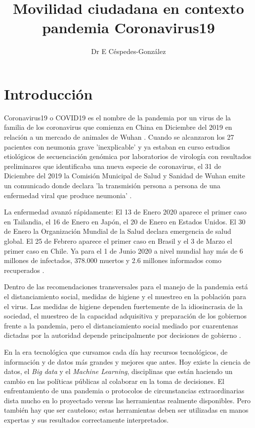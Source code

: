 \documentclass{article}
\title{Movilidad ciudadana en contexto pandemia Coronavirus19}
\author{Dr E Céspedes-González}
\date{\fechafinal}
\begin{document}
\maketitle
\tableofcontents

\newpage

\section{Introducción}

Coronavirus19 o COVID19 es el nombre de la pandemia por un virus de la familia de los coronavirus que comienza en China en Diciembre del 2019 en relación a un mercado de animales de Wuhan \cite{wang_novel_2020}. Cuando se alcanzaron los 27 pacientes con neumonia grave 'inexplicable' y ya estaban en curso estudios etiológicos de secuenciación genómica por laboratorios de virología con resultados preliminares que identificaba una nueva especie de coronavirus, el 31 de Diciembre del 2019 la Comisión Municipal de Salud y Sanidad de Wuhan emite un comunicado donde declara 'la transmisión persona a persona de una enfermedad viral que produce neumonia' \cite{oms_oms_2020}.

La enfermedad avanzó rápidamente:  El 13 de Enero 2020 aparece el primer caso en Tailandia, el 16 de Enero en Japón, el 20 de Enero en Estados Unidos. El 30 de Enero la Organización Mundial de la Salud declara emergencia de salud global. El 25 de Febrero aparece el primer caso en Brasil y el 3 de Marzo el primer caso en Chile. Ya para el 1 de Junio 2020 a nivel mundial hay más de 6 millones de infectados, 378.000 muertos y 2.6 millones informados como recuperados \cite{oms_covid-19_2020}.

Dentro de las recomendaciones transversales para el manejo de la pandemia está el distanciamiento social, medidas de higiene y el muestreo en la población para el virus. Las medidas de higiene dependen fuertemente de la idiosincrasia de la sociedad, el muestreo de la capacidad adquisitiva y preparación de los gobiernos frente a la pandemia, pero el distanciamiento social mediado por cuarentenas dictadas por la autoridad depende principalmente por decisiones de gobierno \cite{painter_political_2020, organization_critical_2020}.

En la era tecnológica que cursamos cada día hay recursos tecnológicos, de información y de datos más grandes y mejores que antes. Hoy existe la ciencia de datos, el \textit{Big data} y el \textit{Machine Learning}, disciplinas que están haciendo un cambio en las políticas públicas al colaborar en la toma de decisiones. El enfrentamiento de una pandemia o protocolos de circunstancias extraordinarias dista mucho en lo proyectado versus las herramientas realmente disponibles. Pero también hay que ser cauteloso; estas herramientas deben ser utilizadas en manos expertas y sus resultados correctamente interpretados.
\end{document}

